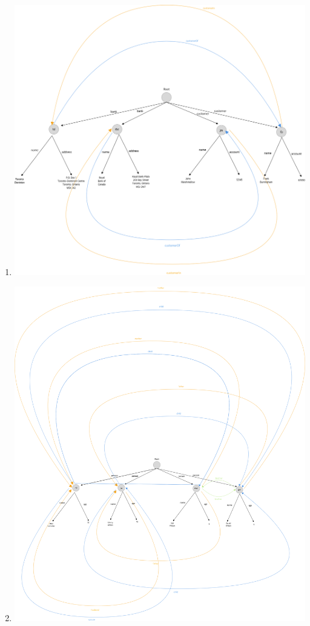 \documentclass[12pt]{article}
\begin{document}
\begin{enumerate}[1.]
\begin{enumerate}[a)]
    \end{enumerate}

    \item

    \begin{center}
    \includegraphics[width=\linewidth]{images/worksheet_9_solution_7.png}
    \end{center}

    \item

    \begin{center}
    \includegraphics[width=\linewidth]{images/worksheet_9_solution_8.png}
    \end{center}


\end{enumerate}
\end{document}
